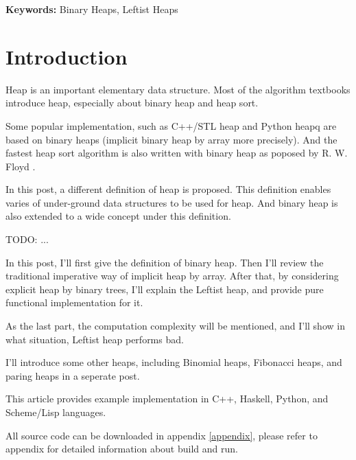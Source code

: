 \documentclass{article}
\begin{document}
\vspace{3cm}
{\bfseries Keywords:} Binary Heaps, Leftist Heaps


\maketitle

\section{Introduction}
\label{introduction}

Heap is an important elementary data structure. Most of the algorithm
textbooks introduce heap, especially about binary heap and heap sort.

Some popular implementation, such as C++/STL heap and Python heapq
are based on binary heaps (implicit binary heap by array
more precisely). And the fastest heap sort algorithm is also
written with binary heap as poposed by R. W. Floyd
\cite{wiki-heapsort} \cite{rosetta-heapsort}.

In this post, a different definition of heap is proposed. This definition
enables varies of under-ground data structures to be used for heap.
And binary heap is also extended to a wide concept under this definition.

TODO: ...

In this post, I'll first give the definition of binary heap. Then
I'll review the traditional imperative way of implicit heap by array.
After that, by considering explicit heap by binary trees, I'll
explain the Leftist heap, and provide pure functional implementation
for it.

As the last part, the computation complexity will be mentioned, and
I'll show in what situation, Leftist heap performs bad.

I'll introduce some other heaps, including Binomial heaps, Fibonacci
heaps, and paring heaps in a seperate post.

This article provides example implementation in C++, Haskell, Python, and 
Scheme/Lisp languages. 

All source code can be downloaded in appendix \ref{appendix}, please 
refer to appendix for detailed information about build and run.
\end{document}
